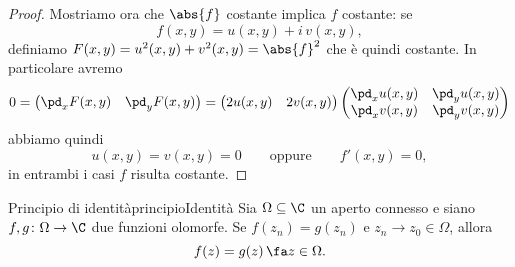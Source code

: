 \begin{proof}
	Mostriamo ora che \(\abs{f}\) costante implica \(f\) costante: se
	\[
		f(x,y) = u(x,y)+i\,v(x,y),
	\]
	definiamo \(F(x,y)=u^2(x,y)+v^2(x,y)=\abs{f}^2\) che è quindi costante. In particolare avremo
	\[
		0 = \begin{pmatrix}\pd_x F(x,y) & \pd_y F(x,y)\end{pmatrix} = \begin{pmatrix}2u(x,y) & 2v(x,y)\end{pmatrix}
		\begin{pmatrix}
			\pd_x u(x,y) & \pd_y u(x,y) \\
			\pd_x v(x,y) & \pd_y v(x,y)
		\end{pmatrix}
	\]
	abbiamo quindi
	\[
		u(x,y) = v(x,y) = 0 \qquad\text{oppure}\qquad f'(x,y)=0,
	\]
	in entrambi i casi \(f\) risulta costante.
\end{proof}
%
%
\begin{teor}{Principio di identità}{principioIdentità}
	Sia \(\Omega\subseteq\C\) un aperto connesso e siano \(f,g\colon \Omega \to \C\) due funzioni olomorfe.
	Se \(f(z_n)=g(z_n)\) e \(z_n \to z_0\in\Omega\), allora
	\[
		f(z)=g(z)\,\fa z \in \Omega.
	\]
\end{teor}

